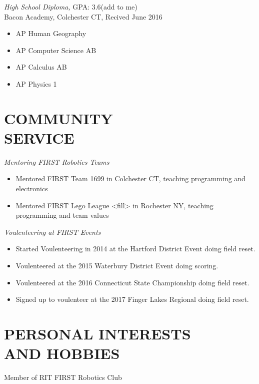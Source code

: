 \documentclass[line,margin]{res}
\begin{document}
\begin{resume}
	{\sl High School Diploma,} GPA: 3.6(add to me)\\
				Bacon Academy, Colchester CT,
				Recived June 2016
				\begin{multicols}{2}
					\begin{itemize}
						\itemsep -2pt
						\item[] AP Human Geography
						\item[] AP Computer Science AB
						\item[] AP Calculus AB
						\item[] AP Physics 1
					\end{itemize}
				\end{multicols}
\vspace{8pt}
\section{COMMUNITY \\ SERVICE}  

	{\sl Mentoring FIRST Robotics Teams}
	\begin{itemize}  
		\itemsep -2pt
		\item Mentored FIRST Team 1699 in Colchester CT, teaching programming and electronics
		\item Mentored FIRST Lego League <fill> in Rochester NY, teaching programming and team values
	\end{itemize}

	{\sl Voulenteering at FIRST Events}
	\begin{itemize}
		\itemsep -2pt
		\item Started Voulenteering in 2014 at the Hartford District Event doing field reset.
		\item Voulenteered at the 2015 Waterbury District Event doing scoring.
		\item Voulenteered at the 2016 Connecticut State Championship doing field reset.
		\item Signed up to voulenteer at the 2017 Finger Lakes Regional doing field reset.
	\end{itemize}

\section{PERSONAL INTERESTS \\ AND HOBBIES}             
	Member of RIT FIRST Robotics Club\\

\end{resume}
\end{document}
